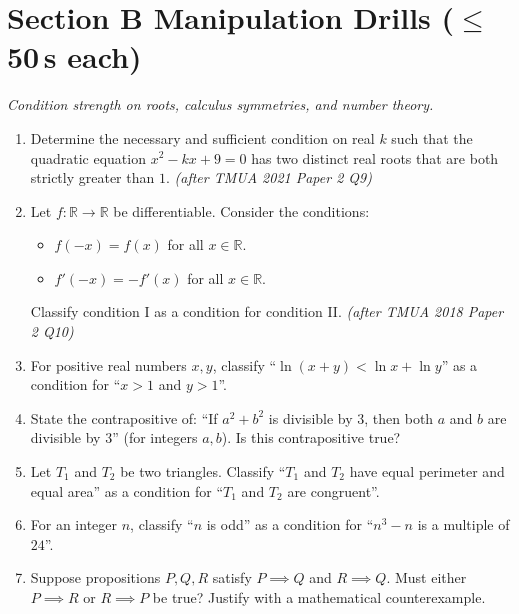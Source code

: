 \documentclass[11pt,a4paper]{article}
\begin{document}
\section*{Section B \quad Manipulation Drills \hfill{\normalfont\small($\leq$50\,s each)}}

\noindent\textit{Condition strength on roots, calculus symmetries, and number theory.}

\begin{enumerate}

\item Determine the necessary and sufficient condition on real $k$ such that the quadratic equation $x^2 - kx + 9 = 0$ has two distinct real roots that are both strictly greater than $1$. \textit{\small(after TMUA 2021 Paper 2 Q9)}

\item Let $f:\mathbb{R}\to\mathbb{R}$ be differentiable. Consider the conditions:
\begin{itemize}
\item[I.] $f(-x) = f(x)$ for all $x \in \mathbb{R}$.
\item[II.] $f'(-x) = -f'(x)$ for all $x \in \mathbb{R}$.
\end{itemize}
Classify condition I as a condition for condition II. \textit{\small(after TMUA 2018 Paper 2 Q10)}

\item For positive real numbers $x, y$, classify ``$\ln(x+y) < \ln x + \ln y$'' as a condition for ``$x > 1$ and $y > 1$''.

\item State the contrapositive of: ``If $a^2 + b^2$ is divisible by $3$, then both $a$ and $b$ are divisible by $3$'' (for integers $a, b$). Is this contrapositive true?

\item Let $T_1$ and $T_2$ be two triangles. Classify ``$T_1$ and $T_2$ have equal perimeter and equal area'' as a condition for ``$T_1$ and $T_2$ are congruent''.

\item For an integer $n$, classify ``$n$ is odd'' as a condition for ``$n^3 - n$ is a multiple of $24$''.

\item Suppose propositions $P, Q, R$ satisfy $P \implies Q$ and $R \implies Q$. Must either $P \implies R$ or $R \implies P$ be true? Justify with a mathematical counterexample.


\end{enumerate}
\end{document}
